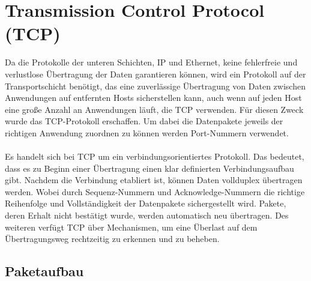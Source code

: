 \FloatBarrier
\section{Transmission Control Protocol (TCP)}
Da die Protokolle der unteren Schichten, IP und Ethernet, keine fehlerfreie und verlustlose Übertragung der Daten garantieren können, wird ein Protokoll auf der Transportschicht benötigt, das eine zuverlässige Übertragung von Daten zwischen Anwendungen auf entfernten Hosts sicherstellen kann, auch wenn auf jeden Host eine große Anzahl an Anwendungen läuft, die TCP verwenden. Für diesen Zweck wurde das TCP-Protokoll erschaffen. Um dabei die Datenpakete jeweils der richtigen Anwendung zuordnen zu können werden Port-Nummern verwendet. \\\\
Es handelt sich bei TCP um ein verbindungsorientiertes Protokoll. Das bedeutet, dass es zu Beginn einer Übertragung einen klar definierten Verbindungsaufbau gibt. Nachdem die Verbindung etabliert ist, können Daten vollduplex übertragen werden. Wobei durch Sequenz-Nummern und Acknowledge-Nummern die richtige Reihenfolge und Vollständigkeit der Datenpakete sichergestellt wird. Pakete, deren Erhalt nicht bestätigt wurde, werden automatisch neu übertragen. Des weiteren verfügt TCP über Mechanismen, um eine Überlast auf dem Übertragungsweg rechtzeitig zu erkennen und zu beheben.  

\subsection{Paketaufbau}


